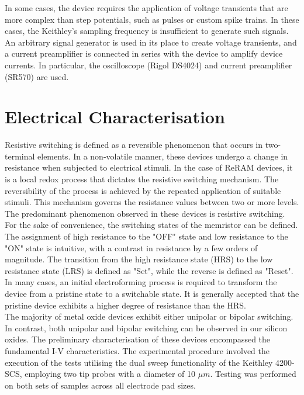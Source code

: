 \noindent In some cases, the device requires the application of voltage transients that are more complex than step potentials, such as pulses or custom spike trains. In these cases, the Keithley's sampling frequency is insufficient to generate such signals. An arbitrary signal generator is used in its place to create voltage transients, and a current preamplifier is connected in series with the device to amplify device currents. In particular, the oscilloscope (Rigol DS4024) and current preamplifier (SR570) are used.

\section[Electrical Characterisation]{Electrical Characterisation}

\noindent Resistive switching is defined as a reversible phenomenon that occurs in two-terminal elements. In a non-volatile manner, these devices undergo a change in resistance when subjected to electrical stimuli. In the case of ReRAM devices, it is a local redox process that dictates the resistive switching mechanism. The reversibility of the process is achieved by the repeated application of suitable stimuli. This mechanism governs the resistance values between two or more levels. \\

\noindent The predominant phenomenon observed in these devices is resistive switching. For the sake of convenience, the switching states of the memristor can be defined. The assignment of high resistance to the "OFF" state and low resistance to the "ON" state is intuitive, with a contrast in resistance by a few orders of magnitude. The transition from the high resistance state (HRS) to the low resistance state (LRS) is defined as "Set", while the reverse is defined as "Reset". In many cases, an initial electroforming process is required to transform the device from a pristine state to a switchable state. It is generally accepted that the pristine device exhibits a higher degree of resistance than the HRS.\\

\noindent The majority of metal oxide devices exhibit either unipolar or bipolar switching. In contrast, both unipolar and bipolar switching can be observed in our silicon oxides. The preliminary characterisation of these devices encompassed the fundamental I-V characteristics. The experimental procedure involved the execution of the tests utilising the dual sweep functionality of the Keithley 4200-SCS, employing two tip probes with a diameter of 10 $\mu m$. Testing was performed on both sets of samples across all electrode pad sizes.

